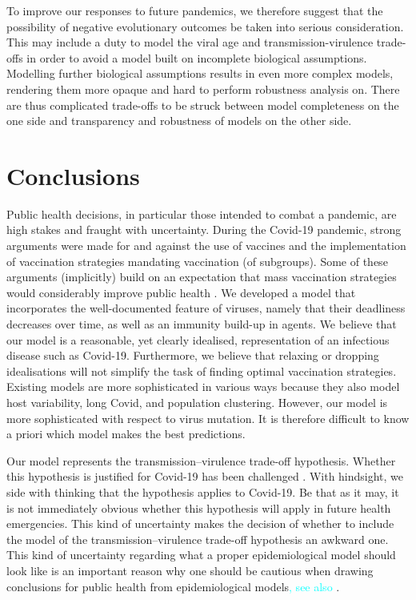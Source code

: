 \documentclass[a4paper,12pt]{article}
\newcommand{\juergen}[1]{\textcolor{cyan}{#1}}
\begin{document}
To improve our responses to future pandemics, we therefore suggest that the possibility of negative evolutionary outcomes be taken into serious consideration. This may include a duty to model the viral age and transmission-virulence trade-offs in order to avoid a model built on incomplete biological assumptions. Modelling further biological assumptions results in even more complex models, rendering them more opaque and hard to perform robustness analysis on. There are thus complicated trade-offs to be struck between model completeness on the one side and transparency and robustness of models on the other side.

\section{Conclusions}\label{sec:Conclusions}
Public health decisions, in particular those intended to combat a pandemic, are high stakes and fraught with uncertainty. During the Covid-19 pandemic, strong arguments were made for and against the use of vaccines and the implementation of vaccination strategies mandating vaccination (of subgroups). Some of these arguments (implicitly) build on an expectation that mass vaccination strategies would considerably improve public health \cite[P.\ 3]{Rouzine2023}. We developed a model that incorporates the well-documented feature of viruses, namely that their deadliness decreases over time, as well as an immunity build-up in agents. We believe that our model is a reasonable, yet clearly idealised, representation of an infectious disease such as Covid-19. Furthermore, we believe that relaxing or dropping idealisations will not simplify the task of finding optimal vaccination strategies. Existing models are more sophisticated in various ways because they also model host variability, long Covid, and population clustering. However, our model is more sophisticated with respect to virus mutation. It is therefore difficult to know a priori which model makes the best predictions.

Our model represents the transmission–virulence trade-off hypothesis. Whether this hypothesis is justified for Covid-19 has been challenged \cite{Kun2023}. With hindsight, we side with \cite{Bruessow2022} thinking that the hypothesis applies to Covid-19. Be that as it may, it is not immediately obvious whether this hypothesis will apply in future health emergencies. This kind of uncertainty makes the decision of whether to include the model of the transmission–virulence trade-off hypothesis an awkward one. This kind of uncertainty regarding what a proper epidemiological model should look like is an important reason why one should be cautious when drawing conclusions for public health from epidemiological models\juergen{, see also \cite{Saltelli2020}}.
\end{document}
